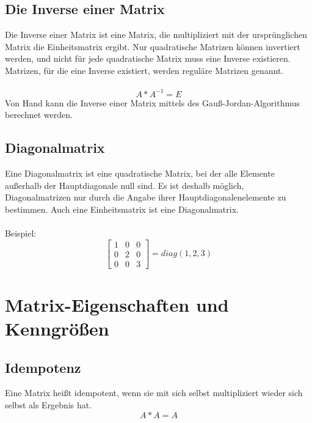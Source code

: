 \documentclass[11pt]{scrreprt}
\begin{document}
\subsection{Die Inverse einer Matrix}
Die Inverse einer Matrix ist eine Matrix, die multipliziert mit der ursprünglichen Matrix die Einheitsmatrix ergibt. Nur quadratische Matrizen können invertiert werden, und nicht für jede quadratische Matrix muss eine Inverse existieren. Matrizen, für die eine Inverse existiert, werden reguläre Matrizen genannt.\\
\\
\begin{equation}
A * A^{-1} = E
\end{equation}
Von Hand kann die Inverse einer Matrix mittels des Gauß-Jordan-Algorithmus berechnet werden.
\subsection{Diagonalmatrix}
Eine Diagonalmatrix ist eine quadratische Matrix, bei der alle Elemente außerhalb der Hauptdiagonale null sind. Es ist deshalb möglich, Diagonalmatrizen nur durch die Angabe ihrer Hauptdiagonalenelemente zu bestimmen. Auch eine Einheitsmatrix ist eine Diagonalmatrix.\\
\\
Beispiel:
\begin{equation}
\begin{bmatrix}
1 & 0 & 0 \\
0 & 2 & 0 \\
0 & 0 & 3 
\end {bmatrix}
= diag(1,2,3)
\end{equation}
\section{Matrix-Eigenschaften und Kenngrößen}
\subsection{Idempotenz}
Eine Matrix heißt idempotent, wenn sie mit sich selbst multipliziert wieder sich selbst als Ergebnis hat.
\begin{equation}
A * A = A
\end{equation}
\end{document}

